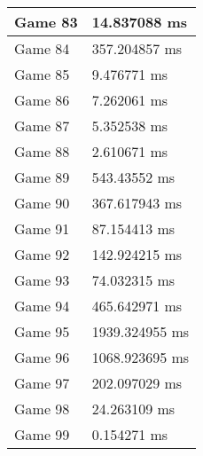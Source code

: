 \begin{tabular}{|l|l|}
	Game 83 & 14.837088 ms \\ \hline
	Game 84 & 357.204857 ms \\ \hline
	Game 85 & 9.476771 ms \\ \hline
	Game 86 & 7.262061 ms \\ \hline
	Game 87 & 5.352538 ms \\ \hline
	Game 88 & 2.610671 ms \\ \hline
	Game 89 & 543.43552 ms \\ \hline
	Game 90 & 367.617943 ms \\ \hline
	Game 91 & 87.154413 ms \\ \hline
	Game 92 & 142.924215 ms \\ \hline
	Game 93 & 74.032315 ms \\ \hline
	Game 94 & 465.642971 ms \\ \hline
	Game 95 & 1939.324955 ms \\ \hline
	Game 96 & 1068.923695 ms \\ \hline
	Game 97 & 202.097029 ms \\ \hline
	Game 98 & 24.263109 ms \\ \hline
	Game 99 & 0.154271 ms \\ \hline
\end{tabular}
